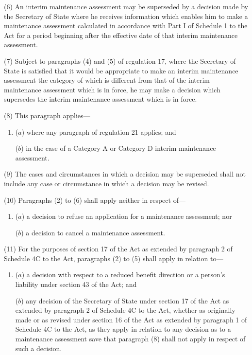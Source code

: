 \documentclass[a4paper,12pt]{article}
\begin{document}
(6) An interim maintenance assessment may be superseded by a decision made by the Secretary of State where he receives information which enables him to make a maintenance assessment calculated in accordance with Part I of Schedule 1 to the Act for a period beginning after the effective date of that interim maintenance assessment.

(7) Subject to paragraphs (4) and (5) of regulation 17, where the Secretary of State is satisfied that it would be appropriate to make an interim maintenance assessment the category of which is different from that of the interim maintenance assessment which is in force, he may make a decision which supersedes the interim maintenance assessment which is in force.

(8) This paragraph applies---
\begin{enumerate}\item[]
($a$) where any paragraph of regulation 21 applies; and

($b$) in the case of a Category A or Category D interim maintenance assessment.
\end{enumerate}

(9) The cases and circumstances in which a decision may be superseded shall not include any case or circumstance in which a decision may be revised.

(10) Paragraphs (2) to (6) shall apply neither in respect of---
\begin{enumerate}\item[]
($a$) a decision to refuse an application for a maintenance assessment; nor

($b$) a decision to cancel a maintenance assessment.
\end{enumerate}

(11) For the purposes of section 17 of the Act as extended by paragraph 2 of Schedule 4C to the Act, paragraphs (2) to (5) shall apply in relation to---
\begin{enumerate}\item[]
($a$) a decision with respect to a reduced benefit direction or a person’s liability under section 43 of the Act; and

($b$) any decision of the Secretary of State under section 17 of the Act as extended by paragraph 2 of Schedule 4C to the Act, whether as originally made or as revised under section 16 of the Act as extended by paragraph 1 of Schedule 4C to the Act, as they apply in relation to any decision as to a maintenance assessment save that paragraph (8) shall not apply in respect of such a decision.
\end{enumerate}
\end{document}
